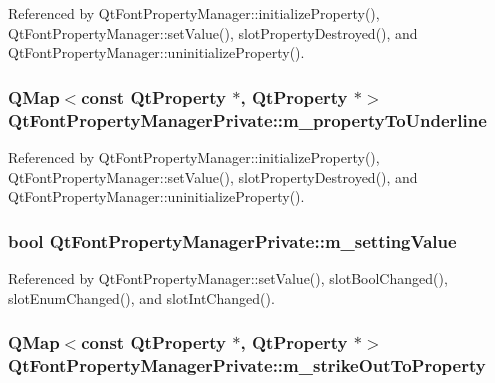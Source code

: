 Referenced by Qt\+Font\+Property\+Manager\+::initialize\+Property(), Qt\+Font\+Property\+Manager\+::set\+Value(), slot\+Property\+Destroyed(), and Qt\+Font\+Property\+Manager\+::uninitialize\+Property().

\subsubsection[{m\+\_\+property\+To\+Underline}]{\setlength{\rightskip}{0pt plus 5cm}Q\+Map$<$const {\bf Qt\+Property} $\ast$, {\bf Qt\+Property} $\ast$$>$ Qt\+Font\+Property\+Manager\+Private\+::m\+\_\+property\+To\+Underline}\label{classQtFontPropertyManagerPrivate_a66f40ca2cc7b520e586a87a34a17ff07}


Referenced by Qt\+Font\+Property\+Manager\+::initialize\+Property(), Qt\+Font\+Property\+Manager\+::set\+Value(), slot\+Property\+Destroyed(), and Qt\+Font\+Property\+Manager\+::uninitialize\+Property().

\subsubsection[{m\+\_\+setting\+Value}]{\setlength{\rightskip}{0pt plus 5cm}bool Qt\+Font\+Property\+Manager\+Private\+::m\+\_\+setting\+Value}\label{classQtFontPropertyManagerPrivate_a6fd9c0b3e27471c357f3aa6a8ae43ada}


Referenced by Qt\+Font\+Property\+Manager\+::set\+Value(), slot\+Bool\+Changed(), slot\+Enum\+Changed(), and slot\+Int\+Changed().

\subsubsection[{m\+\_\+strike\+Out\+To\+Property}]{\setlength{\rightskip}{0pt plus 5cm}Q\+Map$<$const {\bf Qt\+Property} $\ast$, {\bf Qt\+Property} $\ast$$>$ Qt\+Font\+Property\+Manager\+Private\+::m\+\_\+strike\+Out\+To\+Property}\label{classQtFontPropertyManagerPrivate_af37a4dfe11094520d5ab70fd8f151724}


